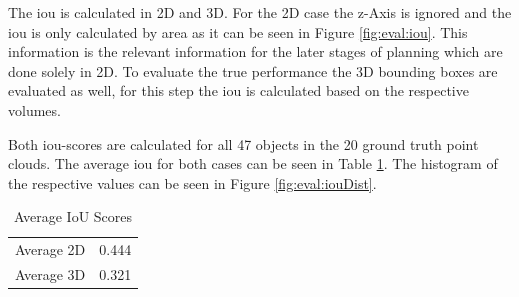 The \ac{iou} is calculated in 2D and 3D. For the 2D case the z-Axis is ignored and the \ac{iou} is only calculated by area as it can be seen in Figure \ref{fig:eval:iou}.
This information is the relevant information for the later stages of planning which are done solely in 2D. To evaluate the true performance the 3D bounding boxes are evaluated as well,
for this step the \ac{iou} is calculated based on the respective volumes.

Both \ac{iou}-scores are calculated for all 47 objects in the 20 ground truth point clouds. 
The average \ac{iou} for both cases can be seen in Table \ref{tab:eval:iou}.
The histogram of the respective values can be seen in Figure \ref{fig:eval:iouDist}.

\begin{table}[h!]
    \centering
    \begin{tabular}{cc}
        \toprule
        Average 2D & 0.444 \\
        Average 3D & 0.321 \\
        \bottomrule
    \end{tabular}
    \caption{Average IoU Scores} 
    \label{tab:eval:iou}
\end{table}

